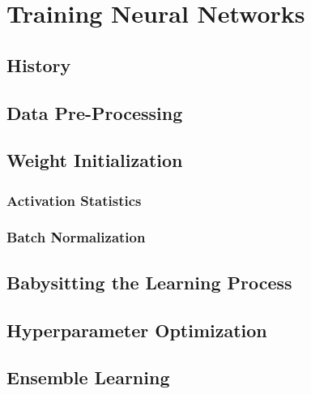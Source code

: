 \chapter{Training Neural Networks} %

	\section{History} %

	\section{Data Pre-Processing} %

	\section{Weight Initialization} %

		\subsection{Activation Statistics} %

		\subsection{Batch Normalization} %

	\section{Babysitting the Learning Process} %

	\section{Hyperparameter Optimization} %
		\label{sec:hyperparameterOpt}


	\section{Ensemble Learning} %


